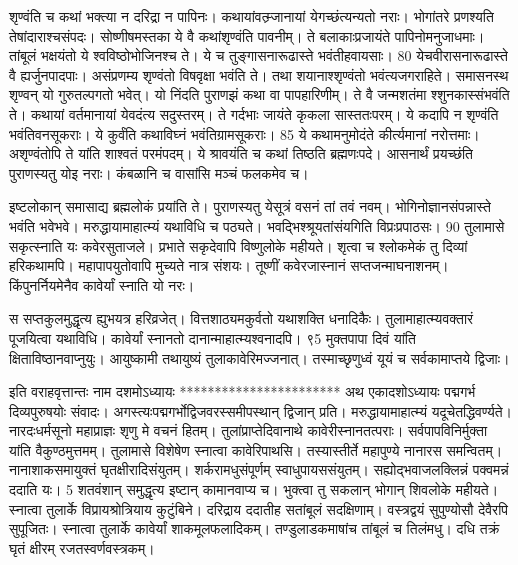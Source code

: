 शृण्वंति च कथां भक्त्या न दरिद्रा न पापिनः।
 कथायांवत्म्र्जानायां येगच्छंत्यन्यतो नराः।
 भोगांतरे प्रणश्यति तेषांदाराश्चसंपदः।
 सोष्णीषमस्तका ये वै कथांशृण्वंति पावनीम्।
 ते बलाकाःप्रजायंते पापिनोमनुजाधमाः।
 तांबूलं भक्षयंतो ये श्वविष्ठोभोजिनश्च ते।
 ये च तुङ्गासनारूढास्ते भवंतीहवायसाः।
 80 येचवीरासनारूढास्ते वै ह्यर्जुनपादपाः।
 असंप्रणम्य शृण्वंतो विषवृक्षा भवंति ते।
 तथा शयानाश्शृण्वंतो भवंत्यजगराहिते।
 समासनस्थ शृण्वन् यो गुरुतल्पगतो भवेत्।
 यो निंदति पुराणझं कथा वा पापहारिणीम्।
 ते वै जन्मशतंमा श्शुनकास्संभवंति ते।
 कथायां वर्तमानायां येवदंत्य सदुस्तरम्।
 ते गर्दभाः जायंते कृकला सास्ततःपरम्।
 ये कदापि न शृण्वंति भवंतिवनसूकराः।
 ये कुर्वंति कथाविघ्नं भवंतिग्रामसूकराः।
 85 ये कथामनुमोदंते कीर्त्यमानां नरोत्तमाः।
 अशृण्वंतोपि ते यांति शाश्वतं परमंपदम्।
 ये श्रावयंति च कथां तिष्ठति ब्रह्मणःपदे।
 आसनार्थं प्रयच्छंति पुराणस्यतु योइ नराः।
 कंबळानि च वासांसि मञ्चं फलकमेव च।
 
इष्टलोकान् समासाद्य ब्रह्मलोकं प्रयांति ते।
 पुराणस्यतु येसूत्रं वसनं तां तवं नवम्।
 भोगिनोज्ञानसंपन्नास्ते भवंति भवेभवे।
 मरुद्धायामाहात्म्यं यथाविधि च पठ्यते।
 भवद्भिश्श्रूयतांसंयगिति विप्रःप्रपाठसः।
 90 तुलामासे सकृत्स्नाति यः कवेरसुताजले।
 प्रभाते सकृदेवापि विष्णुलोके महीयते।
 शृत्वा च श्लोकमेकं तु दिव्यां हरिकथामपि।
 महापापयुतोवापि मुच्यते नात्र संशयः।
 तूष्णीं कवेरजास्नानं सप्तजन्माघनाशनम्।
 किंपुनर्नियमेनैव कावेर्यां स्नाति यो नरः।
 
स सप्तकुलमुद्धृत्य ह्युभयत्र हरिव्रजेत्।
 वित्तशाठ्यमकुर्वतो यथाशक्ति धनादिकैः।
 तुलामाहात्म्यवक्तारं पूजयित्वा यथाविधि।
 कावेर्यां स्नानतो दानान्माहात्म्यश्वनादपि।
 ९5 मुक्तपापा दिवं यांति क्षिताविष्ठानवाप्नुयुः।
 आयुष्कामी तथायुष्यं तुलाकावेरिमज्जनात्।
 तस्माच्छृणुध्वं यूयं च सर्वकामाप्तये द्विजाः।
 
इति वराहवृत्तान्तः नाम दशमोऽध्यायः
***********************
अथ एकादशोऽध्यायः
पद्मगर्भ दिव्यपुरुषयोः संवादः।
 अगस्त्यःपद्मगर्भोद्विजवरस्समीपस्थान् द्विजान् प्रति।
 मरुद्धायामाहात्म्यं यदूचेतद्धिवर्ण्यते।
 नारदःधर्मसूनो महाप्राज्ञः शृणु मे वचनं हितम्।
 तुलांप्राप्तेदिवानाथे कावेरीस्नानतत्पराः।
 सर्वपापविनिर्मुक्ता यांति वैकुण्ठमुत्तमम्।
 तुलामासे विशेषेण स्नात्वा कावेरिपाथसि।
 तस्यास्तीर्ते महापुण्ये नानारस समन्वितम्।
 नानाशाकसमायुक्तं घृतक्षीरादिसंयुतम्।
 शर्करामधुसंपूर्णम् स्वाधुपायससंयुतम्।
 सह्योद्भवाजलक्लिन्नं पक्वमन्नं ददाति यः।
 5 शतवंशान् समुद्धृत्य इष्टान् कामानवाप्य च।
 भुक्त्वा तु सकलान् भोगान् शिवलोके महीयते।
 स्नात्वा तुलार्के विप्रायश्रोत्रियाय कुटुंबिने।
 दरिद्राय ददातीह सतांबूलं सदक्षिणाम्।
 वस्त्रद्वयं सुपुण्योसौ देवैरपि सुपूजितः।
 स्नात्वा तुलार्के कावेर्यां शाकमूलफलादिकम्।
 तण्डुलाडकमाषांच तांबूलं च तिलंमधु।
 दधि तक्रं घृतं क्षीरम् रजतस्वर्णवस्त्रकम्।
 
